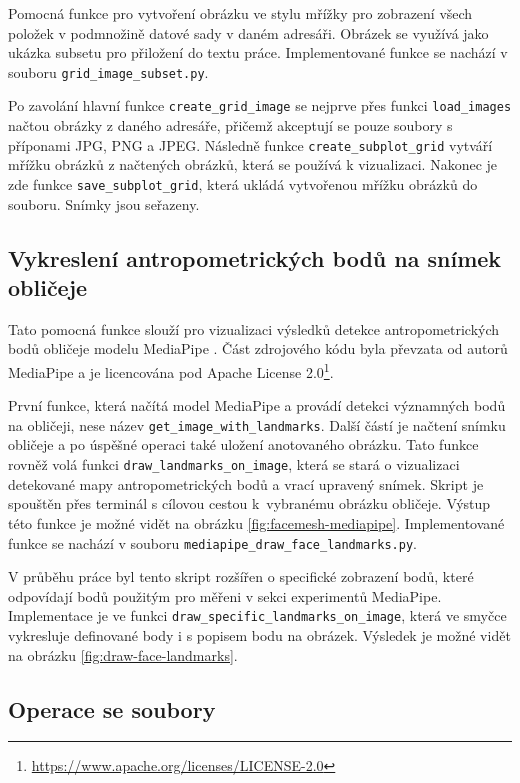 Pomocná funkce pro vytvoření obrázku ve stylu mřížky pro zobrazení všech položek v podmnožině datové sady v daném adresáři. Obrázek se využívá jako ukázka subsetu pro přiložení do textu práce. Implementované funkce se nachází v souboru \texttt{grid\_image\_subset.py}.

Po zavolání hlavní funkce \texttt{create\_grid\_image} se nejprve přes funkci \texttt{load\_images} načtou obrázky z daného adresáře, přičemž akceptují se pouze soubory s příponami JPG, PNG a JPEG. Následně funkce \texttt{create\_subplot\_grid} vytváří mřížku obrázků z načtených obrázků, která se používá k vizualizaci. Nakonec je zde funkce \texttt{save\_subplot\_grid}, která ukládá vytvořenou mřížku obrázků do souboru. Snímky jsou seřazeny.

\subsection*{Vykreslení antropometrických bodů na snímek obličeje}

Tato pomocná funkce slouží pro vizualizaci výsledků detekce antropometrických bodů obličeje modelu MediaPipe \cite{mediapipe}. Část zdrojového kódu byla převzata od autorů MediaPipe a je licencována pod Apache License 2.0\footnote{\url{https://www.apache.org/licenses/LICENSE-2.0}}.

První funkce, která načítá model MediaPipe a provádí detekci významných bodů na obličeji, nese název \texttt{get\_image\_with\_landmarks}. Další částí je načtení snímku obličeje a po úspěšné operaci také uložení anotovaného obrázku. Tato funkce rovněž volá funkci \texttt{draw\_landmarks\_on\_image}, která se stará o vizualizaci detekované mapy antropometrických bodů a vrací upravený snímek. Skript je spouštěn přes terminál s cílovou cestou k~vybranému obrázku obličeje. Výstup této funkce je možné vidět na obrázku \ref{fig:facemesh-mediapipe}. Implementované funkce se nachází v souboru \texttt{mediapipe\_draw\_face\_landmarks.py}.

V průběhu práce byl tento skript rozšířen o specifické zobrazení bodů, které odpovídají bodů použitým pro měřeni v sekci experimentů MediaPipe. Implementace je ve funkci \texttt{draw\_specific\_landmarks\_on\_image}, která ve smyčce vykresluje definované body i s popisem bodu na obrázek. Výsledek je možné vidět na obrázku \ref{fig:draw-face-landmarks}.

\subsection*{Operace se soubory}


